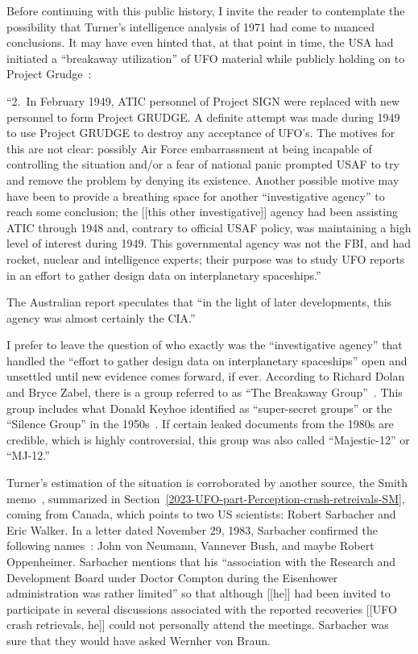 Before continuing with this public history, I invite the reader to contemplate the possibility that Turner's intelligence analysis of 1971 had come to nuanced conclusions. It may have even hinted that, at that point in time, the USA had initiated a ``breakaway utilization'' of UFO material while publicly holding on to Project Grudge~\cite{TurnerAustralia1971}:
\begin{svgraybox}
``2.~In February 1949, ATIC personnel of Project SIGN were
replaced with new personnel to form Project GRUDGE. A definite
attempt was made during 1949 to use Project GRUDGE to destroy any
acceptance of UFO's. The motives for this are not clear: possibly
Air Force embarrassment at being incapable of controlling the
situation and/or a fear of national panic prompted USAF to try and
remove the problem by denying its existence. Another possible
motive may have been to provide a breathing space for another
``investigative agency'' to reach some conclusion; the [[this other investigative]] agency had been
assisting ATIC through 1948 and, contrary to official USAF policy,
was maintaining a high level of interest during 1949. This governmental
agency was not the FBI, and had rocket, nuclear and intelligence
experts; their purpose was to study UFO reports in an effort to gather
design data on interplanetary spaceships.''
\end{svgraybox}
The Australian report speculates that ``in the light of later developments, this agency was almost certainly the CIA.''

I prefer to leave the question of who exactly was the ``investigative agency'' that handled the ``effort to gather design data on interplanetary spaceships'' open and unsettled until new evidence comes forward, if ever. According to Richard Dolan and Bryce Zabel, there is a group referred to as ``The Breakaway Group''~\cite{DolanZabel2012May}. This group includes what Donald Keyhoe identified as ``super-secret groups'' or the ``Silence Group'' in the 1950s~\cite[Foreword]{Keyhoe1955}. If certain leaked documents from the 1980s are credible, which is highly controversial, this group was also called ``Majestic-12'' or ``MJ-12.''

Turner's estimation of the situation is corroborated by another source, the Smith memo~\cite{SmithWilbertMemo},
summarized in Section~\ref{2023-UFO-part-Perception-crash-retreivals-SM}, coming from Canada, which points to two US scientists:
Robert Sarbacher and Eric Walker. In a letter dated November 29, 1983, Sarbacher confirmed the following names~\cite{Sarbacher-83}:
John von Neumann, Vannever Bush, and maybe Robert Oppenheimer. Sarbacher mentions that his
``association with the Research and Development Board under Doctor Compton during the Eisenhower administration was rather limited''
so that although [[he]] had been invited to participate in several discussions associated with the reported recoveries [[UFO crash retrievals, he]]
could not personally attend the meetings. Sarbacher was sure that they would have asked Wernher von Braun.


